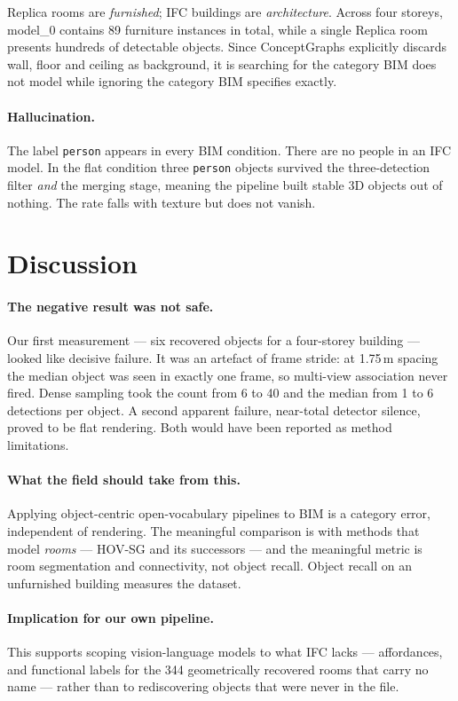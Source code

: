 \documentclass[11pt,a4paper]{article}
\begin{document}
Replica rooms are \emph{furnished}; IFC buildings are \emph{architecture}. Across
four storeys, model\_0 contains 89 furniture instances in total, while a single
Replica room presents hundreds of detectable objects. Since ConceptGraphs
explicitly discards wall, floor and ceiling as background, it is searching for
the category BIM does not model while ignoring the category BIM specifies
exactly.

\paragraph{Hallucination.} The label \texttt{person} appears in every BIM
condition. There are no people in an IFC model. In the flat condition three
\texttt{person} objects survived the three-detection filter \emph{and} the
merging stage, meaning the pipeline built stable 3D objects out of nothing. The
rate falls with texture but does not vanish.

\section{Discussion}

\paragraph{The negative result was not safe.} Our first measurement --- six
recovered objects for a four-storey building --- looked like decisive failure. It
was an artefact of frame stride: at 1.75\,m spacing the median object was seen
in exactly one frame, so multi-view association never fired. Dense sampling took
the count from 6 to 40 and the median from 1 to 6 detections per object. A
second apparent failure, near-total detector silence, proved to be flat
rendering. Both would have been reported as method limitations.

\paragraph{What the field should take from this.} Applying object-centric
open-vocabulary pipelines to BIM is a category error, independent of rendering.
The meaningful comparison is with methods that model \emph{rooms} --- HOV-SG and
its successors --- and the meaningful metric is room segmentation and
connectivity, not object recall. Object recall on an unfurnished building
measures the dataset.

\paragraph{Implication for our own pipeline.} This supports scoping
vision-language models to what IFC lacks --- affordances, and functional labels
for the 344 geometrically recovered rooms that carry no name --- rather than to
rediscovering objects that were never in the file.
\end{document}
